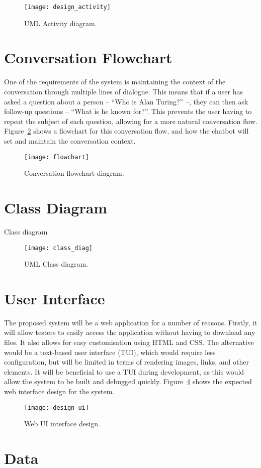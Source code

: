 \begin{figure}[h]
	\begin{center}
		\texttt{[image: design\_activity]}
	\end{center}
	\caption{UML Activity diagram.}
	\label{fig:design_activity}
\end{figure}

\section{Conversation Flowchart}
One of the requirements of the system is maintaining the context of the conversation through multiple lines of dialogue. This means that if a user has asked a question about a person -- ``Who is Alan Turing?'' --, they can then ask follow-up questions -- ``What is he known for?''. This prevents the user having to repeat the subject of each question, allowing for a more natural conversation flow. Figure~\ref{fig:flowchart} shows a flowchart for this conversation flow, and how the chatbot will set and maintain the conversation context.

\begin{figure}[h]
	\begin{center}
		\texttt{[image: flowchart]}
	\end{center}
	\caption{Conversation flowchart diagram.}
	\label{fig:flowchart}
\end{figure}

\section{Class Diagram}
Class diagram
\begin{figure}[h]
	\begin{center}
		\texttt{[image: class\_diag]}
	\end{center}
	\caption{UML Class diagram.}
	\label{fig:class_diagram}
\end{figure}

\newpage
\section{User Interface}
The proposed system will be a web application for a number of reasons. Firstly, it will allow testers to easily access the application without having to download any files. It also allows for easy customisation using HTML and CSS. The alternative would be a text-based user interface (TUI), which would require less configuration, but will be limited in terms of rendering images, links, and other elements. It will be beneficial to use a TUI during development, as this would allow the system to be built and debugged quickly. Figure~\ref{fig:design_ui} shows the expected web interface design for the system.

\begin{figure}[h]
	\begin{center}
		\texttt{[image: design\_ui]}
	\end{center}
	\caption{Web UI interface design.}
	\label{fig:design_ui}
\end{figure}

\section{Data}